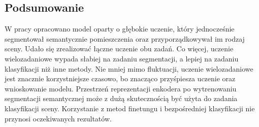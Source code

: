 \subsection{Podsumowanie}

W pracy opracowano model oparty o głębokie uczenie, który jednocześnie segmentował semantycznie pomieszczenia oraz przyporządkowywał im rodzaj sceny. Udało się zrealizować łączne uczenie obu zadań. Co więcej, uczenie wielozadaniowe wypada słabiej na zadaniu segmentacji, a lepiej na zadaniu klasyfikacji niż inne metody. Nie mniej mimo fluktuacji, uczenie wielozadaniowe jest znacznie korzystniejsze czasowo, bo znacząco przyśpiesza uczenie oraz wnioskowanie modelu. Przestrzeń reprezentacji enkodera po wytrenowaniu segmentacji semantycznej może z dużą skutecznością być użyta do zadania klasyfikacji sceny. Korzystanie z metod finetungu i bezpośredniej klasyfikacji nie przynosi oczekiwanych rezultatów.










